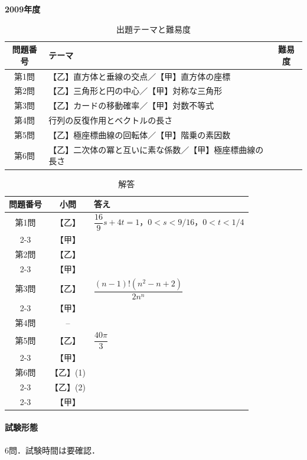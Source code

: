 \documentclass[../../main.tex]{subfiles}
\begin{document}
\begin{center}
  {\fontsize{48pt}{58pt}\selectfont \textbf{2009}\normalsize\textbf{年度}}
\end{center}

\begin{table}[htb]
  \centering
  \caption{出題テーマと難易度}
  \begin{tabular}{|c|p{9cm}|c|}
    \hline
    \textbf{問題番号} & \textbf{テーマ} & \textbf{難易度} \\
    \hline
    第1問 & 【乙】直方体と垂線の交点／【甲】直方体の座標 & \\
    \hline
    第2問 & 【乙】三角形と円の中心／【甲】対称な三角形 & \\
    \hline
    第3問 & 【乙】カードの移動確率／【甲】対数不等式 & \\
    \hline
    第4問 & 行列の反復作用とベクトルの長さ & \\
    \hline
    第5問 & 【乙】極座標曲線の回転体／【甲】階乗の素因数 & \\
    \hline
    第6問 & 【乙】二次体の冪と互いに素な係数／【甲】極座標曲線の長さ & \\
    \hline
  \end{tabular}
\end{table}

\begin{table}[htb]
  \centering
  \caption{解答}
  \renewcommand{\arraystretch}{1.4}
  \begin{tabular}{|c|c|p{9cm}|}
    \hline
    \textbf{問題番号} & \textbf{小問} & \textbf{答え} \\
    \hline
    第1問 & 【乙】 & $\dfrac{16}{9}s+4t=1$，$0<s<9/16$，$0<t<1/4$ \\
    \cline{2-3}
    & 【甲】 &  \\
    \hline
    第2問 & 【乙】 &  \\
    \cline{2-3}
    & 【甲】 &  \\
    \hline
    第3問 & 【乙】 & $\dfrac{(n-1)!(n^2-n+2)}{2n^n}$ \\
    \cline{2-3}
    & 【甲】 &  \\
    \hline
    第4問 & -- &  \\
    \hline
    第5問 & 【乙】 & $\dfrac{40\pi}{3}$ \\
    \cline{2-3}
    & 【甲】 &  \\
    \hline
    第6問 & 【乙】(1) &  \\
    \cline{2-3}
    & 【乙】(2) &  \\
    \cline{2-3}
    & 【甲】 &  \\
    \hline
  \end{tabular}
\end{table}

\paragraph{試験形態}
6問．試験時間は要確認．
\end{document}
